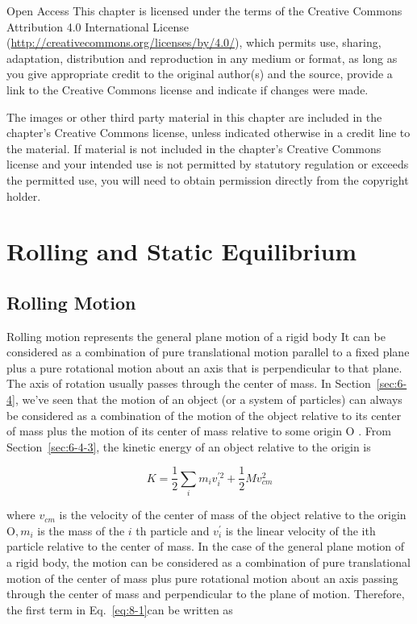 \documentclass[10pt]{article}
\numberwithin{equation}{section}
\begin{document}
Open Access This chapter is licensed under the terms of the Creative Commons Attribution 4.0 International License (\href{http://creativecommons.org/licenses/by/4.0/}{http://creativecommons.org/licenses/by/4.0/}), which permits use, sharing, adaptation, distribution and reproduction in any medium or format, as long as you give appropriate credit to the original author(s) and the source, provide a link to the Creative Commons license and indicate if changes were made.

The images or other third party material in this chapter are included in the chapter's Creative Commons license, unless indicated otherwise in a credit line to the material. If material is not included in the chapter's Creative Commons license and your intended use is not permitted by statutory regulation or exceeds the permitted use, you will need to obtain permission directly from the copyright holder.

\section{Rolling and Static Equilibrium}\label{chap:8}
\subsection{Rolling Motion}\label{sec:8-1}
Rolling motion represents the general plane motion of a rigid body It can be considered as a combination of pure translational motion parallel to a fixed plane plus a pure rotational motion about an axis that is perpendicular to that plane. The axis of rotation usually passes through the center of mass. In Section~\ref{sec:6-4}, we've seen that the motion of an object (or a system of particles) can always be considered as a combination of the motion of the object relative to its center of mass plus the motion of its center of mass relative to some origin O . From Section~\ref{sec:6-4-3}, the kinetic energy of an object relative to the origin is


\begin{equation}
K=\frac{1}{2} \sum_{i} m_{i} v_{i}^{\prime 2}+\frac{1}{2} M v_{c m}^{2} \label{eq:8-1}
\end{equation}


where $v_{c m}$ is the velocity of the center of mass of the object relative to the origin $\mathrm{O}, m_{i}$ is the mass of the $i$ th particle and $v_{i}^{\prime}$ is the linear velocity of the ith particle relative to the center of mass. In the case of the general plane motion of a rigid body, the motion can be considered as a combination of pure translational motion of the center of mass plus pure rotational motion about an axis passing through the center of mass and perpendicular to the plane of motion. Therefore, the first term in Eq.~\eqref{eq:8-1}can be written as
\end{document}
